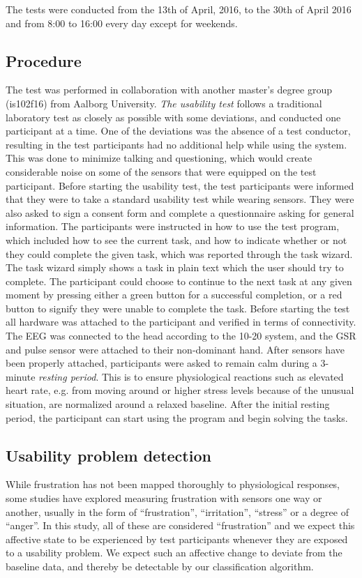 The tests were conducted from the 13th of April, 2016, to the 30th of April 2016 and from 8:00 to 16:00 every day except for weekends. 

\subsection{Procedure}
The test was performed in collaboration with another master's degree group (is102f16) from Aalborg University.
\textit{The usability test} follows a traditional laboratory test as closely as possible with some deviations, and conducted one participant at a time. 
One of the deviations was the absence of a test conductor, resulting in the test participants had no additional help while using the system. 
This was done to minimize talking and questioning, which would create considerable noise on some of the sensors that were equipped on the test participant.
Before starting the usability test, the test participants were informed that they were to take a standard usability test while wearing sensors.
They were also asked to sign a consent form and complete a questionnaire asking for general information.  
The participants were instructed in how to use the test program, which included how to see the current task, and how to indicate whether or not they could complete the given task, which was reported through the task wizard. 
The task wizard simply shows a task in plain text which the user should try to complete. The participant could choose to continue to the next task at any given moment by pressing either a green button for a successful completion, or a red button to signify they were unable to complete the task. 
Before starting the test all hardware was attached to the participant and verified in terms of connectivity. 
The EEG was connected to the head according to the 10-20 system\cite{eeg_tech_10_20}, and the GSR and pulse sensor were attached to their non-dominant hand.
After sensors have been properly attached, participants were asked to remain calm during a 3-minute \textit{resting period}. 
This is to ensure physiological reactions such as elevated heart rate, e.g. from moving around or higher stress levels because of the unusual situation, are normalized around a relaxed baseline. 
After the initial resting period, the participant can start using the program and begin solving the tasks. 

\subsection{Usability problem detection}
While frustration has not been mapped thoroughly to physiological responses, some studies have explored measuring
frustration with sensors one way or another, usually in the form of ``frustration'', ``irritation'', ``stress'' or a
degree of ``anger''. 
In this study, all of these are considered ``frustration'' and we expect this affective state to be
experienced by test participants whenever they are exposed to a usability problem. We expect such an affective change
to deviate from the baseline data, and thereby be detectable by our classification algorithm.


